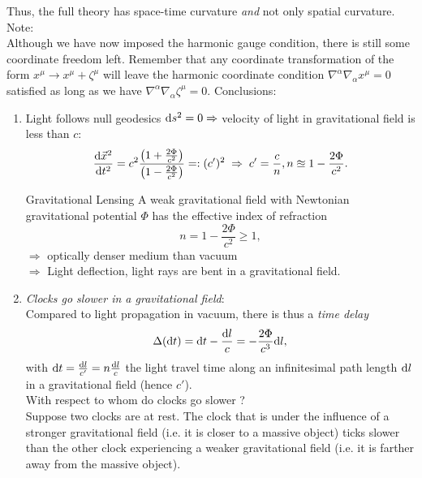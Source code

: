 Thus, the full theory has space-time curvature \emph{and} not only spatial curvature.\\
Note: \\
Although we have now imposed the harmonic gauge condition, there is still some coordinate freedom left. Remember that any coordinate transformation of the form
$x^μ → x^μ + ζ^μ$ will leave the harmonic coordinate condition $\nabla^\alpha \nabla_\alpha x^μ = 0$ satisfied as long as we have $\nabla^\alpha \nabla_\alpha ζ^μ = 0$.
Conclusions:
\begin{enumerate}
	\item Light follows null geodesics $\mathrm{d} s^2=0 \Rightarrow$ velocity of light in gravitational field is less than $c$:
	\begin{equation}
	\frac{\mathrm{d} \vec{x}^2}{\mathrm{d} t^2} = c^2 \frac{\left(1+\frac{2 \Phi}{c^2}\right)}{\left(1-\frac{2 \Phi}{c^2}\right)} =: (c')^2 \; \Rightarrow \; c' = \frac{c}{n}, n \approxeq 1-\frac{2 \Phi}{c^2}.
	\end{equation}
	\begin{mybox}{Gravitational Lensing}
		A weak gravitational field with Newtonian gravitational potential $\Phi$ has the effective index of refraction
		\begin{equation}
		n = 1- \frac{2 \Phi}{c^2} \geq 1, 
		\end{equation}
		$\Rightarrow$ optically denser medium than vacuum\\
		$\Rightarrow$ Light deflection, light rays are bent in a gravitational field.
	\end{mybox}
	\item \emph{Clocks go slower in a gravitational field}:\\
	Compared to light propagation in vacuum, there is thus a \emph{time delay}
	\begin{equation}
		\Delta(\mathrm{d} t) = \mathrm{d} t-\frac{\mathrm{d} l}{c} = - \frac{2 \Phi}{c^3} \mathrm{d} l,
	\end{equation}
	with $\mathrm{d} t=\frac{\mathrm{d} l}{c'}= n \frac{\mathrm{d} l}{c}$ the light travel time along an infinitesimal path length $\mathrm{d} l$ in a gravitational field (hence $c'$).\\
	With respect to whom do clocks go slower ?\\
	Suppose two clocks are at rest. The clock that is under the influence of a stronger gravitational
	field (i.e. it is closer to a massive object) ticks slower than the other clock experiencing a weaker
	gravitational field (i.e. it is farther away from the massive object).
\end{enumerate}

